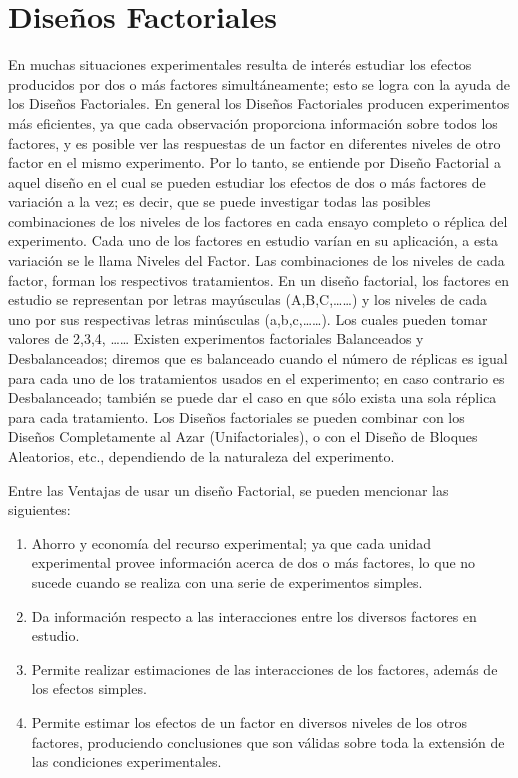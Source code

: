 \documentclass[12pt,letterpaper]{report}
\begin{document}
\chapter*{Diseños Factoriales}
En muchas situaciones experimentales resulta de interés estudiar los efectos producidos
por dos o más factores simultáneamente; esto se logra con la ayuda de los Diseños Factoriales.
En general los Diseños Factoriales producen experimentos más eficientes, ya que cada
observación proporciona información sobre todos los factores, y es posible ver las respuestas
de un factor en diferentes niveles de otro factor en el mismo experimento. Por lo tanto, se
entiende por Diseño Factorial a aquel diseño en el cual se pueden estudiar los efectos de dos
o más factores de variación a la vez; es decir, que se puede investigar todas las posibles
combinaciones de los niveles de los factores en cada ensayo completo o réplica del
experimento.
Cada uno de los factores en estudio varían en su aplicación, a esta variación se le llama
Niveles del Factor. Las combinaciones de los niveles de cada factor, forman los respectivos
tratamientos.
En un diseño factorial, los factores en estudio se representan por letras mayúsculas
(A,B,C,……) y los niveles de cada uno por sus respectivas letras minúsculas (a,b,c,……). Los
cuales pueden tomar valores de 2,3,4, ……
Existen experimentos factoriales Balanceados y Desbalanceados; diremos que es
balanceado cuando el número de réplicas es igual para cada uno de los tratamientos usados en
el experimento; en caso contrario es Desbalanceado; también se puede dar el caso en que sólo
exista una sola réplica para cada tratamiento. Los Diseños factoriales se pueden combinar con
los Diseños Completamente al Azar (Unifactoriales), o con el Diseño de Bloques Aleatorios, etc.,
dependiendo de la naturaleza del experimento.

Entre las Ventajas de usar un diseño Factorial, se pueden mencionar las siguientes:
\begin{enumerate}
\item Ahorro y economía del recurso experimental; ya que cada unidad experimental provee
información acerca de dos o más factores, lo que no sucede cuando se realiza con una serie
de experimentos simples.

\item Da información respecto a las interacciones entre los diversos factores en estudio.

\item Permite realizar estimaciones de las interacciones de los factores, además de los efectos
simples.

\item Permite estimar los efectos de un factor en diversos niveles de los otros factores,
produciendo conclusiones que son válidas sobre toda la extensión de las condiciones
experimentales.
\end{enumerate}
\end{document}
